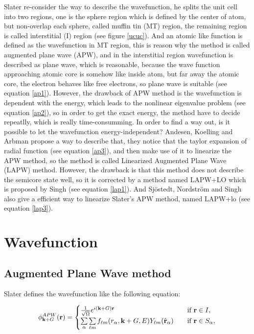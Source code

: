 \documentclass[a4paper, 12pt, titlepage,oneside,drop]{kthesis}
\begin{document}
\noindent Slater re-consider the way to describe the wavefunction, he splits the unit cell into two regions, one is the sphere region which is
defined by the center of atom, but non-overlap each sphere, called muffin tin (MT) region, the remaining region is called interstitial 
(I) region (see figure \ref{ucuc}). And an atomic like function is defined as the wavefunction in MT region, this is reason why the method is called augmented plane wave (APW),
 and in the interstitial region wavefunction is described as plane wave, which is reasonable, because the wave 
function approaching atomic core is somehow like inside atom, but far away the atomic core, the electron behaves like free electrons,
 so plane wave is suitable (see equation \ref{ap1}). However, the drawback of APW method is the wavefunction is dependent with the energy, which leads to the 
nonlinear eigenvalue problem (see equation \ref{ap2}), so in order to get the exact energy, the method have to decide repeatlly, which is really time-consumming.
\noindent In order to find a way out, is it possible to let the wavefunction energy-independent? Andesen, Koelling and Arbman propose a way to describe that,
they notice that the taylor expansion of radial function (see equation \ref{ap3}), and then make use of it to linearize the APW method, so the method is called Linearized Augmented Plane Wave (LAPW)
method. However, the drawback is that this method does not describe the semicore state well, so it is corrected by a method named LAPW+LO which is proposed by Singh (see equation \ref{lap1}). And
Sjöstedt, Nordström and Singh also give a efficient way to linearize Slater's APW method, named LAPW+lo (see equation \ref{lap3}).



\section{Wavefunction}
\subsection{Augmented Plane Wave method}
\noindent Slater defines the wavefunction like the following equation:


\begin{equation}\label{ap1}
\phi^{APW}_{\textbf k+G} ({\textbf r})= 
\begin{cases} \frac {1}{\sqrt{\Omega}} e^{i({ \textbf k+G}) {\textbf r}} & \quad \mbox{if ${\textbf r} \in I, $} 
\\
\sumg<\alpha>\sum\limits_{{\ell}m} f_{{\ell}{m}} (r_{\alpha},{\textbf k+G}, E) Y_{{\ell}m}(\hat{{\textbf r}}_{\alpha})  & \quad \mbox{if $ {\textbf r} \in S_\alpha, $}\\ 
\end{cases}
\end{equation}
\end{document}
